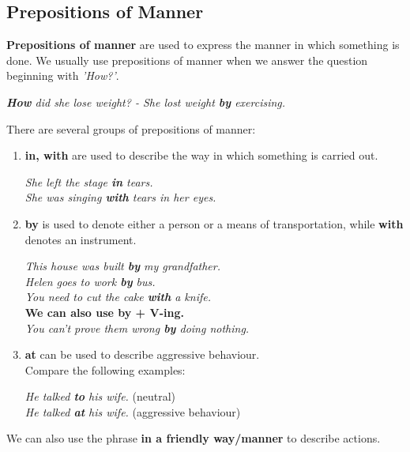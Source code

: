 \documentclass[hidelinks,10pt,a4paper]{article}
\begin{document}
\subsection{Prepositions of Manner}

\textbf{Prepositions of manner} are used to express the manner in which something is done. We usually use prepositions of manner when we answer the question beginning with \textit{'How?'}.

\begin{center}
	\textit{\textbf{How} did she lose weight? - She lost weight \textbf{by} exercising.}
\end{center}

There are several groups of prepositions of manner:
\begin{enumerate}[label=(\alph*)]
	\item \textbf{in, with} are used to describe the way in which something is carried out. \\
		\begin{center}
			\textit{She left the stage \textbf{in} tears.\\
			She was singing \textbf{with} tears in her eyes.}
		\end{center}
	\item \textbf{by} is used to denote either a person or a means of transportation, while \textbf{with} denotes an instrument.
		\begin{center}
			\textit{This house was built \textbf{by} my grandfather.}\\
			\textit{Helen goes to work \textbf{by} bus.} \\
			\textit{You need to cut the cake \textbf{with} a knife. }\\
			\textbf{We can also use by + V-ing.}\\
			\textit{You can't prove them wrong \textbf{by} doing nothing.}
		\end{center}
	\item \textbf{at} can be used to describe aggressive behaviour.\\
		Compare the following examples:
		\begin{center}
			\textit{He talked \textbf{to} his wife.} (neutral)\\
			\textit{He talked \textbf{at} his wife.} (aggressive behaviour)
		\end{center}
\end{enumerate}

We can also use the phrase \textbf{in a friendly way/manner} to describe actions.
\end{document}
